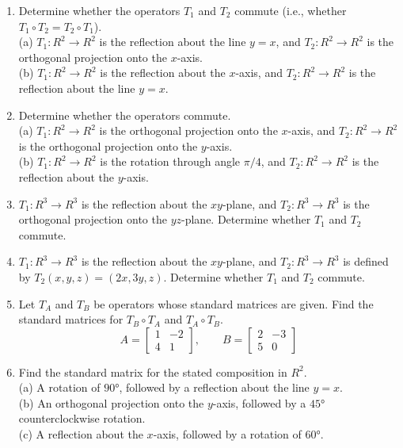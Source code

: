 \documentclass{article}
\theoremstyle{mystyle}
\begin{document}
\begin{enumerate}
\item[1.] Determine whether the operators $T_1$ and $T_2$ commute (i.e., whether $T_1\circ T_2=T_2\circ T_1$).\\
(a) $T_1:R^2\to R^2$ is the reflection about the line $y=x$, and $T_2:R^2\to R^2$ is the orthogonal projection onto the $x$-axis.\\
(b) $T_1:R^2\to R^2$ is the reflection about the $x$-axis, and $T_2:R^2\to R^2$ is the reflection about the line $y=x$.

\item[2.] Determine whether the operators commute.\\
(a) $T_1:R^2\to R^2$ is the orthogonal projection onto the $x$-axis, and $T_2:R^2\to R^2$ is the orthogonal projection onto the $y$-axis.\\
(b) $T_1:R^2\to R^2$ is the rotation through angle $\pi/4$, and $T_2:R^2\to R^2$ is the reflection about the $y$-axis.

\item[3.] $T_1:R^3\to R^3$ is the reflection about the $xy$-plane, and $T_2:R^3\to R^3$ is the orthogonal projection onto the $yz$-plane. Determine whether $T_1$ and $T_2$ commute.

\item[4.] $T_1:R^3\to R^3$ is the reflection about the $xy$-plane, and $T_2:R^3\to R^3$ is defined by $T_2(x,y,z)=(2x,3y,z)$. Determine whether $T_1$ and $T_2$ commute.

\item[5.] Let $T_A$ and $T_B$ be operators whose standard matrices are given. Find the standard matrices for $T_B\circ T_A$ and $T_A\circ T_B$.
\[
A=\begin{bmatrix}1&-2\\4&1\end{bmatrix},\qquad B=\begin{bmatrix}2&-3\\5&0\end{bmatrix}
\]

\item[7.] Find the standard matrix for the stated composition in $R^2$.\\
(a) A rotation of $90°$, followed by a reflection about the line $y=x$.\\
(b) An orthogonal projection onto the $y$-axis, followed by a $45°$ counterclockwise rotation.\\
(c) A reflection about the $x$-axis, followed by a rotation of $60°$.


\end{enumerate}
\end{document}
